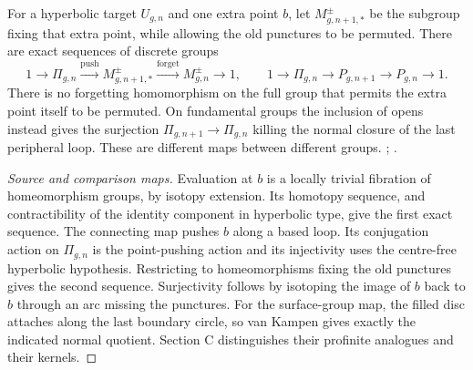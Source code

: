 For a hyperbolic target $U_{g,n}$ and one extra point $b$, let $M^{\pm}_{g,n+1,*}$ be the subgroup fixing that extra point, while allowing the old punctures to be permuted. There are exact sequences of discrete groups
\[
1\longrightarrow\Pi_{g,n}\xrightarrow{\mathrm{push}}
 M^{\pm}_{g,n+1,*}\xrightarrow{\mathrm{forget}}M^{\pm}_{g,n}\longrightarrow1,
\qquad
1\longrightarrow\Pi_{g,n}\longrightarrow P_{g,n+1}\longrightarrow P_{g,n}\longrightarrow1.
\]
There is no forgetting homomorphism on the full group that permits the extra point itself to be permuted. On fundamental groups the inclusion of opens instead gives the surjection
$\Pi_{g,n+1}\to\Pi_{g,n}$ killing the normal closure of the last peripheral loop. These are different maps between different groups.
; \citet[Theorem 4.6]{AF_FarbMargalit2012}.
\begin{proof}[Source and comparison maps]
Evaluation at $b$ is a locally trivial fibration of homeomorphism groups, by isotopy extension. Its homotopy sequence, and contractibility of the identity component in hyperbolic type, give the first exact sequence. The connecting map pushes $b$ along a based loop. Its conjugation action on $\Pi_{g,n}$ is the point-pushing action and its injectivity uses the centre-free hyperbolic hypothesis. Restricting to homeomorphisms fixing the old punctures gives the second sequence. Surjectivity follows by isotoping the image of $b$ back to $b$ through an arc missing the punctures. For the surface-group map, the filled disc attaches along the last boundary circle, so van Kampen gives exactly the indicated normal quotient. Section C distinguishes their profinite analogues and their kernels.
\end{proof}

